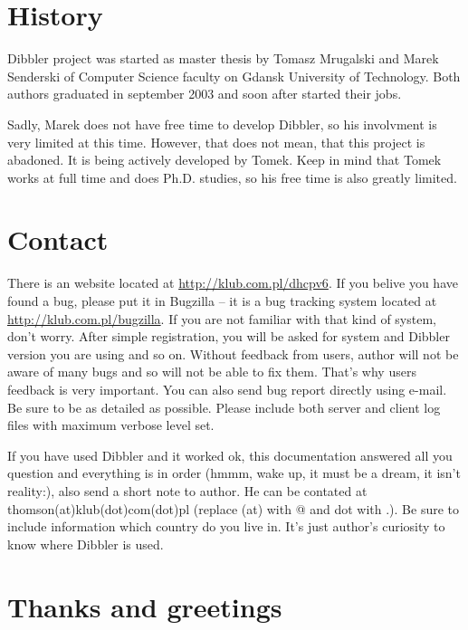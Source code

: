 
\section{History}
 Dibbler project was started as master thesis by Tomasz Mrugalski and
Marek Senderski of  Computer Science faculty on Gdansk University of
Technology. Both authors graduated in september 2003 and soon after
started their jobs. 

Sadly, Marek does not have free time to develop Dibbler, so his
involvment is very limited at this time. However, that does not mean,
that this project is abadoned. It is being actively developed by
Tomek. Keep in mind that Tomek works at full time and does
Ph.D. studies, so his free time is also greatly limited.

\section{Contact}
There is an website located at \url{http://klub.com.pl/dhcpv6}. If
you belive you have found a bug, please put it in Bugzilla -- it is a
bug tracking system located at \url{http://klub.com.pl/bugzilla}. If
you are not familiar with that kind of system, don't worry. After
simple registration, you will be asked for system and Dibbler version
you are using and so on. Without feedback from users, author will not
be aware of many bugs and so will not be able to fix them. That's why
users feedback is very important. You can also send bug report
directly using e-mail. Be sure to be as detailed as possible. Please
include both server and client log files with maximum verbose level
set. 

If you have used Dibbler and it worked ok, this documentation answered
all you question and everything is in order (hmmm, wake up, it must be
a dream, it isn't reality:), also send a short note to author. He can
be contated at thomson(at)klub(dot)com(dot)pl (replace (at) with @ and
dot with .). Be sure to include information which country do you live
in. It's just author's curiosity to know where Dibbler is used.

\section{Thanks and greetings}

